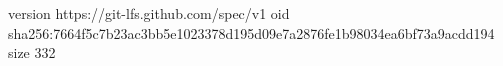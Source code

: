 version https://git-lfs.github.com/spec/v1
oid sha256:7664f5c7b23ac3bb5e1023378d195d09e7a2876fe1b98034ea6bf73a9acdd194
size 332
